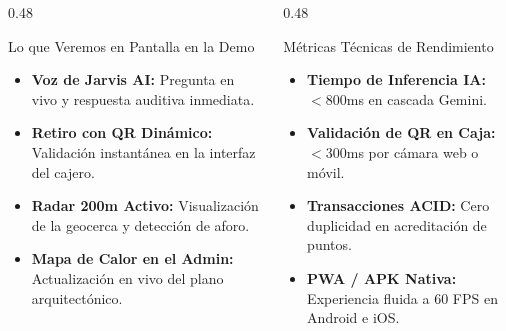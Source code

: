 \documentclass[aspectratio=169, 10pt]{beamer}
\begin{document}
\begin{frame}
  \vskip 0.2cm
  \begin{columns}[T]
    \begin{column}{0.48\textwidth}
      \begin{block}{Lo que Veremos en Pantalla en la Demo}
        \scriptsize
        \begin{itemize}\setlength\itemsep{0.25em}
          \item \textbf{Voz de Jarvis AI:} Pregunta en vivo y respuesta auditiva inmediata.
          \item \textbf{Retiro con QR Dinámico:} Validación instantánea en la interfaz del cajero.
          \item \textbf{Radar 200m Activo:} Visualización de la geocerca y detección de aforo.
          \item \textbf{Mapa de Calor en el Admin:} Actualización en vivo del plano arquitectónico.
        \end{itemize}
      \end{block}
    \end{column}

    \begin{column}{0.48\textwidth}
      \begin{exampleblock}{Métricas Técnicas de Rendimiento}
        \scriptsize
        \begin{itemize}\setlength\itemsep{0.25em}
          \item \textbf{Tiempo de Inferencia IA:} $<800$ms en cascada Gemini.
          \item \textbf{Validación de QR en Caja:} $<300$ms por cámara web o móvil.
          \item \textbf{Transacciones ACID:} Cero duplicidad en acreditación de puntos.
          \item \textbf{PWA / APK Nativa:} Experiencia fluida a 60 FPS en Android e iOS.
        \end{itemize}
      \end{exampleblock}
    \end{column}
  \end{columns}
\end{frame}
\end{document}
